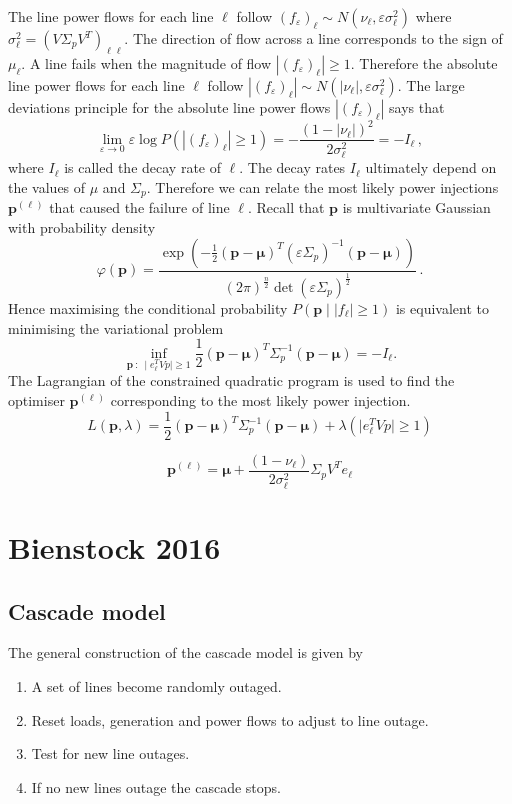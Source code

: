 \documentclass{article}
\newcommand{\e}{\varepsilon}
\renewcommand{\l}{\ell}
\begin{document}
The line power flows for each line $\l$ follow $(f_\e)_\l\sim N(\nu_\l, \e \sigma_\l^2)$ where $\sigma_\l^2 = \left(V\Sigma_p V^T\right)_{\l\l}$. The direction of flow across a line corresponds to the sign of $\mu_\l$. A line fails when the magnitude of flow $|(f_\e)_\l|\ge 1$. Therefore the absolute line power flows for each line $\l$ follow $|(f_\e)_\l |\sim N(|\nu_\l |, \e \sigma_\l^2)$. The large deviations principle for the absolute line power flows $|(f_\e)_\l|$ says that
\[\lim_{\e\to 0} \e \log P(|(f_\e)_\l|\ge 1) =-\frac{(1-|\nu_\l| )^2}{2\sigma_\l^2} = -I_\l \,,\]
where $I_\l$ is called the decay rate of $\l$. The decay rates $I_\l$ ultimately depend on the values of $\mu$ and $\Sigma_p$. Therefore we can relate the most likely power injections $\bm p^{(\l)}$ that caused the failure of line $\l$. Recall that $\bm p$ is multivariate Gaussian with probability density 
\[\varphi(\bm p) = \frac{\exp(-\frac{1}{2}(\bm p - \bm \mu)^T(\e\Sigma_p)^{-1}(\bm p-\bm \mu))}{(2\pi)^{\frac{n}{2}}\det(\e\Sigma_p)^{\frac{1}{2}}} \,.\]
Hence maximising the conditional probability $P(\bm p\mid |f_\l|\ge 1)$ is equivalent to minimising the variational problem
\[\inf_{\bm p\ :\ \mid e_\l^TVp \mid \ge 1} \frac{1}{2}(\bm p - \bm \mu)^T\Sigma_p^{-1}(\bm p-\bm \mu) = -I_\l.\]
The Lagrangian of the constrained quadratic program is used to find the optimiser $\bm p^{(\l)}$ corresponding to the most likely power injection.
\[L(\bm p,\lambda) = \frac{1}{2}(\bm p - \bm \mu)^T\Sigma_p^{-1}(\bm p-\bm \mu) +\lambda(\mid e_\l^TVp \mid \ge 1)\]




\[\bm p^{(\l)} = \bm \mu + \frac{(1-\nu_\l)}{2\sigma_\l^2}\Sigma_p V^T e_\l\]


\section{Bienstock 2016}

\subsection{Cascade model}

The general construction of the cascade model is given by
\begin{enumerate}
\item A set of lines become randomly outaged.
\item Reset loads, generation and power flows to adjust to line outage.
\item Test for new line outages.
\item If no new lines outage the cascade stops.
\end{enumerate}
\end{document}
